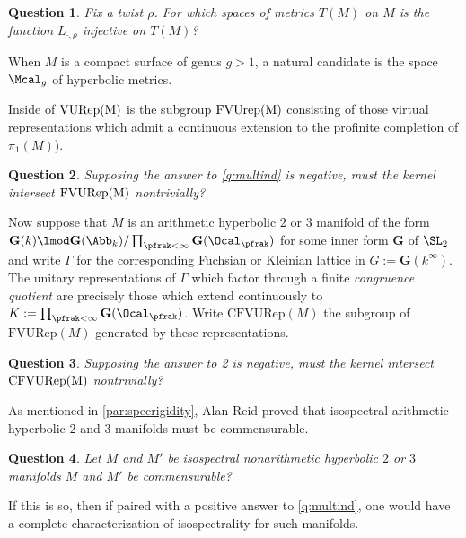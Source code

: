 \documentclass[11pt]{article}
\newtheorem{question}{Question}
\begin{document}
	\begin{question}
		Fix a twist $\rho$. For which spaces of metrics $T(M)$ on $M$ is the function $L_{\cdot, \rho}$ injective on $T(M)$?
	\end{question}
	When $M$ is a compact surface of genus $g>1$, a natural candidate is the space $\Mcal_g$ of hyperbolic metrics.
	
	Inside of ${\rm VURep(M)}$ is the subgroup ${\rm FVUrep(M)}$ consisting of those virtual representations which admit a continuous extension to the profinite completion of $\pi_1(M)$). 
	\begin{question}\label{q:multind2}
		Supposing the answer to \cref{q:multind} is negative, must the kernel intersect ${\rm FVURep(M)}$ nontrivially? 
	\end{question}
	Now suppose that $M$ is an arithmetic hyperbolic $2$ or $3$ manifold of the form $ \mathbf{G}(k) \lmod \mathbf{G}(\Abb_k) / \prod_{\pfrak<\infty} \mathbf{G}(\Ocal_\pfrak) $  for some inner form $\mathbf{G}$ of $\SL_2$ and write $\Gamma $ for the corresponding  Fuchsian or Kleinian lattice in $G:= \mathbf{G}(k^\infty)$. The unitary representations of $\Gamma$ which factor through a finite \emph{congruence quotient} are precisely those which extend continuously to $K:= \prod_{\pfrak<\infty} \mathbf{G}(\Ocal_\pfrak)$. Write $\mathrm{CFVURep}(M)$ the subgroup of $\mathrm{FVURep}(M)$ generated by these representations.  
	\begin{question}\label{q:multind3}
		Supposing the answer to \cref{q:multind2} is negative, must the kernel intersect ${\rm CFVURep(M)}$ nontrivially? 
	\end{question}
	
	As mentioned in \cref{par:specrigidity}, Alan Reid proved that isospectral arithmetic hyperbolic $2$ and $3$ manifolds must be commensurable.  
	\begin{question}
		Let $M$ and $M'$ be isospectral nonarithmetic hyperbolic $2$ or $3$ manifolds
		$M$ and $M'$ be commensurable?  
	\end{question}
	If this is so, then if paired with a positive answer to \cref{q:multind}, one would have a complete characterization of isospectrality for such manifolds. 
	
	
	
	
	
	
	
	
	
	
	
	
	
	\newpage
	
	 
	
	
\end{document}
